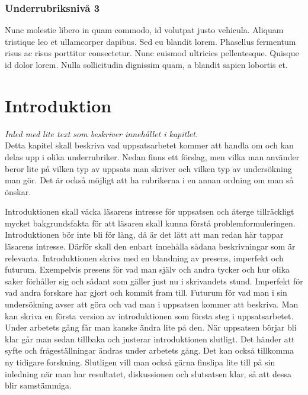 \documentclass[a4paper,12pt]{article} %
\begin{document}
\subsubsection{Underrubriksnivå 3}
Nunc molestie libero in quam commodo, id volutpat justo vehicula. Aliquam tristique leo et ullamcorper dapibus. Sed eu blandit lorem. Phasellus fermentum risus ac risus porttitor consectetur. Nunc euismod ultricies pellentesque. Quisque id dolor lorem. Nulla sollicitudin dignissim quam, a blandit sapien lobortis et.

\section{Introduktion}
\emph{Inled med lite text som beskriver innehållet i kapitlet.}\\
Detta kapitel skall beskriva vad uppsatsarbetet kommer att handla om och kan delas upp i olika underrubriker. Nedan finns ett förslag, men vilka man använder beror lite på vilken typ av uppsats man skriver och vilken typ av undersökning man gör. Det är också möjligt att ha rubrikerna i en annan ordning om man så önskar. 

Introduktionen skall väcka läsarens intresse för uppsatsen och återge tillräckligt mycket bakgrundsfakta för att läsaren skall kunna förstå problemformuleringen. Introduktionen bör inte bli för lång, då är det lätt att man redan här tappar läsarens intresse. Därför skall den enbart innehålla sådana beskrivningar som är relevanta. 
	Introduktionen skrivs med en blandning av presens, imperfekt och futurum. Exempelvis presens för vad man själv och andra tycker och hur olika saker förhåller sig och sådant som gäller just nu i skrivandets stund. Imperfekt för vad andra forskare har gjort och kommit fram till. Futurum för vad man i sin undersökning avser att göra och vad man i uppsatsen kommer att beskriva.
	Man kan skriva en första version av introduktionen som första steg i uppsatsarbetet. Under arbetets gång får man kanske ändra lite på den. När uppsatsen börjar bli klar går man sedan tillbaka och justerar introduktionen slutligt. Det händer att syfte och frågeställningar ändras under arbetets gång. Det kan också tillkomma ny tidigare forskning. Slutligen vill man också gärna finslipa lite till på sin inledning när man har resultatet, diskussionen och slutsatsen klar, så att dessa blir samstämmiga. 

\end{document}
